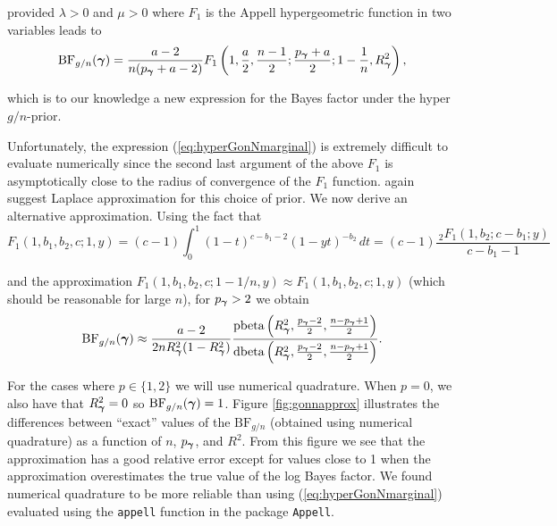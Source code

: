 \noindent provided $\lambda>0$ and $\mu>0$ where $F_1$ is the Appell
hypergeometric function in two variables \citep{Weisstein2009} leads to
\begin{equation}\label{eq:hyperGonNmarginal}
	\displaystyle \mbox{BF}_{g/n}({\boldsymbol \gamma}) =  \frac{a - 2}{n(p_{\boldsymbol \gamma} + a - 2)} F_1\left( 1, \frac{a}{2}, \frac{n-1}{2}; \frac{p_{\boldsymbol \gamma} + a}{2}; 1  -  \frac{1}{n}, R_{\boldsymbol \gamma}^2 \right),
\end{equation}

\noindent which is to our knowledge a new expression for the Bayes factor under
the hyper $g/n$-prior.


Unfortunately, the expression (\ref{eq:hyperGonNmarginal}) is extremely
difficult to evaluate numerically since the second last argument of the above
$F_1$ is asymptotically close to the radius of convergence of the $F_1$
function.  \cite{Liang2008} again suggest Laplace approximation for this choice
of prior. We now derive an alternative approximation.  Using the fact that
$$
F_1(1,b_1,b_2,c; 1,y) 
= (c - 1)
\int_0^1  (1-t)^{c-b_1-2} (1-yt)^{-b_2} \, dt
= (c - 1) \frac{\, _2F_1(1,b_2;c-b_1;y)}{c-b_1-1}
$$

\noindent and the approximation $F_1(1,b_1,b_2,c; 1-1/n,y)  \approx
F_1(1,b_1,b_2,c; 1,y)$ (which should be reasonable for large $n$), for
$p_{\boldsymbol \gamma} > 2$ we obtain
\begin{equation}\label{eq:hyperGonNmarginalApprox}
	\displaystyle \mbox{BF}_{g/n}({\boldsymbol \gamma}) 
	\approx    
	\frac{a - 2}{2n R_{\boldsymbol \gamma}^2(1 - R_{\boldsymbol \gamma}^2)}   \frac{
		\mbox{pbeta}\left( R_{\boldsymbol \gamma}^2, \frac{p_{\boldsymbol \gamma}-2}{2}, \frac{n-p_{\boldsymbol \gamma}+1}{2} \right)
	}{
		\mbox{dbeta}\left( R_{\boldsymbol \gamma}^2, \frac{p_{\boldsymbol \gamma}-2}{2}, \frac{n-p_{\boldsymbol \gamma}+1}{2} \right)
	}.
\end{equation}

\noindent For the cases where $p\in \{1,2\}$ we will use numerical quadrature.
When $p=0$, we also have that $R_{\boldsymbol \gamma}^2= 0$ so $\mbox{BF}_{g/n}({\boldsymbol \gamma}) =
1$.  Figure \ref{fig:gonnapprox} illustrates the differences between ``exact''
values of the $\mbox{BF}_{g/n}$ (obtained using numerical quadrature) as a
function of $n$, $p_{\boldsymbol \gamma}$, and $R^2$. From this figure we see that the
approximation has a good relative error except for values close to 1 when the
approximation overestimates the true value of the log Bayes factor. We found
numerical quadrature to be more reliable than using
(\ref{eq:hyperGonNmarginal}) evaluated using the {\tt appell} function in the
package {\tt Appell}.

